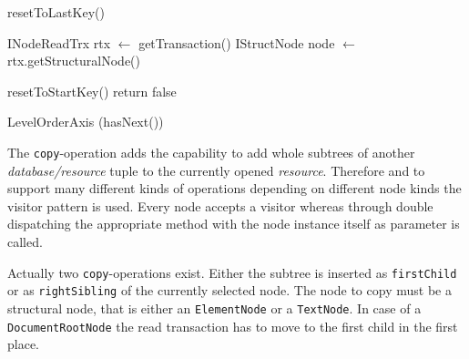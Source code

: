 \begin{algorithm}[Hhtbp]
{}
\BlankLine
{}
  
resetToLastKey()\;

INodeReadTrx rtx $\leftarrow$ getTransaction()\;
IStructNode node $\leftarrow$ rtx.getStructuralNode()\;






resetToStartKey()\;
return false\;
\caption{LevelOrderAxis (hasNext())}\label{levelOrderAxis}
\end{algorithm}

The \texttt{copy}-operation adds the capability to add whole subtrees of another \emph{database/resource} tuple to the currently opened \emph{resource}. Therefore and to support
many different kinds of operations depending on different node kinds the visitor pattern is used. Every node accepts a visitor whereas through double dispatching the appropriate method with the node instance itself as parameter is called.

Actually two \texttt{copy}-operations exist. Either the subtree is inserted as \texttt{first\-Child} or as \texttt{rightSibling} of the currently selected node. The node to copy must be a structural node, that is either an \texttt{ElementNode} or a \texttt{TextNode}. In case of a \texttt{DocumentRootNode} the read transaction has to move to the first child in the first place.

